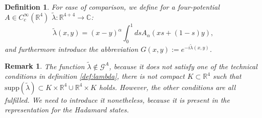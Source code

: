 \documentclass[a4paper,11pt]{article}
\newtheorem{de}{Definition}
\newtheorem{rmk}{Remark}
\begin{document}
\begin{de}
For ease of comparison, we define for a four-potential \(A\in C_c^\infty(\mathbb{R}^4)\)
\(\tilde{\lambda}:\mathbb{R}^{4+4}\rightarrow \mathbb{C}\):
\begin{equation}
\tilde{\lambda}(x,y)= (x-y)^\alpha\int_0^1 ds A_\alpha (x s + (1-s)y),
\end{equation}
and furthermore introduce the abbreviation \(G(x,y):=e^{-i \tilde{\lambda}(x,y)} \).
\end{de}

\begin{rmk}
The function \(\tilde{\lambda}\not\in \mathcal{G}^A\), because it does not satisfy one of the technical conditions in definition
\ref{def:lambda}, there is not compact \(K\subset\mathbb{R}^4\) such that 
\(\mathrm{supp}(\tilde{\lambda})\subset K\times \mathbb{R}^4 \cup \mathbb{R}^4\times K\) holds. However, the other conditions are all fulfilled. 
We need to introduce it nonetheless, because it is present in the representation for the Hadamard states.
\end{rmk}
\end{document}
